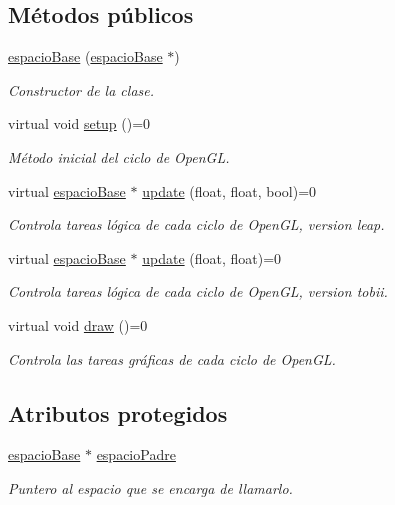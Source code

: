 \subsection*{Métodos públicos}
\begin{DoxyCompactItemize}
\item 
\hyperlink{classespacio_base_a0edb5e65a20296d24f50f3fc007478d3}{espacio\+Base} (\hyperlink{classespacio_base}{espacio\+Base} $\ast$)
\begin{DoxyCompactList}\small\item\em Constructor de la clase. \end{DoxyCompactList}\item 
virtual void \hyperlink{classespacio_base_a65020ad1e767a235b0c227a1769c5416}{setup} ()=0
\begin{DoxyCompactList}\small\item\em Método inicial del ciclo de Open\+G\+L. \end{DoxyCompactList}\item 
virtual \hyperlink{classespacio_base}{espacio\+Base} $\ast$ \hyperlink{classespacio_base_afe08700ffb54b8b8191cdea5ec1671ef}{update} (float, float, bool)=0
\begin{DoxyCompactList}\small\item\em Controla tareas lógica de cada ciclo de Open\+G\+L, version leap. \end{DoxyCompactList}\item 
virtual \hyperlink{classespacio_base}{espacio\+Base} $\ast$ \hyperlink{classespacio_base_abb71ddaa70032182ae4d8370dd05c536}{update} (float, float)=0
\begin{DoxyCompactList}\small\item\em Controla tareas lógica de cada ciclo de Open\+G\+L, version tobii. \end{DoxyCompactList}\item 
virtual void \hyperlink{classespacio_base_a01b3e668211b6159784f79a3f5a32d95}{draw} ()=0
\begin{DoxyCompactList}\small\item\em Controla las tareas gráficas de cada ciclo de Open\+G\+L. \end{DoxyCompactList}\end{DoxyCompactItemize}
\subsection*{Atributos protegidos}
\begin{DoxyCompactItemize}
\item 
\hyperlink{classespacio_base}{espacio\+Base} $\ast$ \hyperlink{classespacio_base_aa0d870b94bfc801da7bd3015fb9ce847}{espacio\+Padre}
\begin{DoxyCompactList}\small\item\em Puntero al espacio que se encarga de llamarlo. \end{DoxyCompactList}\end{DoxyCompactItemize}


